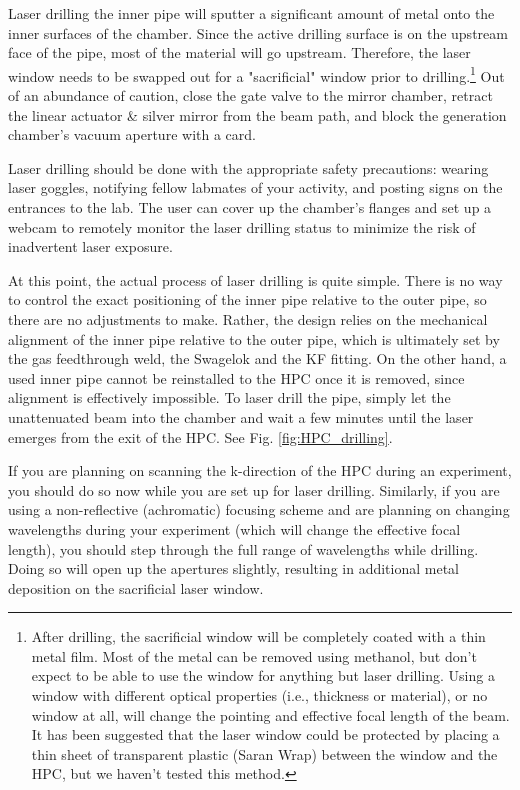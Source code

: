 Laser drilling the inner pipe will sputter a significant amount of metal onto the inner surfaces of the chamber. Since the active drilling surface is on the upstream face of the pipe, most of the material will go upstream. Therefore, the laser window needs to be swapped out for a "sacrificial" window prior to drilling.\footnote{After drilling, the sacrificial window will be completely coated with a thin metal film. Most of the metal can be removed using methanol, but don't expect to be able to use the window for anything but laser drilling. Using a window with different optical properties (i.e., thickness or material), or no window at all, will change the pointing and effective focal length of the beam. It has been suggested that the laser window could be protected by placing a thin sheet of transparent plastic (Saran Wrap) between the window and the HPC, but we haven't tested this method.} Out of an abundance of caution, close the gate valve to the mirror chamber, retract the linear actuator \& silver mirror from the beam path, and block the generation chamber's vacuum aperture with a card.

Laser drilling should be done with the appropriate safety precautions: wearing laser goggles, notifying fellow labmates of your activity, and posting signs on the entrances to the lab. The user can cover up the chamber's flanges and set up a webcam to remotely monitor the laser drilling status to minimize the risk of inadvertent laser exposure.

At this point, the actual process of laser drilling is quite simple. There is no way to control the exact positioning of the inner pipe relative to the outer pipe, so there are no adjustments to make. Rather, the design relies on the mechanical alignment of the inner pipe relative to the outer pipe, which is ultimately set by the gas feedthrough weld, the Swagelok and the KF fitting. On the other hand, a used inner pipe cannot be reinstalled to the HPC once it is removed, since alignment is effectively impossible. To laser drill the pipe, simply let the unattenuated beam into the chamber and wait a few minutes until the laser emerges from the exit of the HPC. See Fig. \ref{fig:HPC_drilling}.

If you are planning on scanning the k-direction of the HPC during an experiment, you should do so now while you are set up for laser drilling. Similarly, if you are using a non-reflective (achromatic) focusing scheme and are planning on changing wavelengths during your experiment (which will change the effective focal length), you should step through the full range of wavelengths while drilling. Doing so will open up the apertures slightly, resulting in additional metal deposition on the sacrificial laser window.


